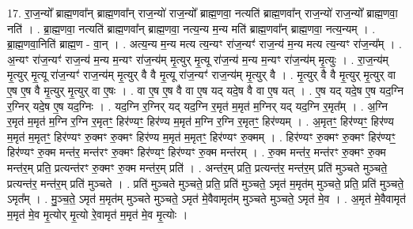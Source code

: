 \documentclass[17pt]{extarticle}
\begin{document}
17. रा॒ज॒न्यो᳚ ब्राह्म॒णवा᳚न् ब्राह्म॒णवा᳚न् राज॒न्यो॑ राज॒न्यो᳚ ब्राह्म॒णवा॒ नत्यति॑ ब्राह्म॒णवा᳚न् राज॒न्यो॑ राज॒न्यो᳚ ब्राह्म॒णवा॒ नति॑ । . ब्रा॒ह्म॒णवा॒ नत्यति॑ ब्राह्म॒णवा᳚न् ब्राह्म॒णवा॒ नत्य॒न्य म॒न्य मति॑ ब्राह्म॒णवा᳚न् ब्राह्म॒णवा॒ नत्य॒न्यम् । . ब्रा॒ह्म॒णवा॒निति॑ ब्राह्म॒ण - वा॒न् । . अत्य॒न्य म॒न्य मत्य त्य॒न्यꣳ रा॑ज॒न्यꣳ॑ राज॒न्य॑ म॒न्य मत्य त्य॒न्यꣳ रा॑ज॒न्य᳚म् । . अ॒न्यꣳ रा॑ज॒न्यꣳ॑ राज॒न्य॑ म॒न्य म॒न्यꣳ रा॑ज॒न्य॑म् मृ॒त्युर् मृ॒त्यू रा॑ज॒न्य॑ म॒न्य म॒न्यꣳ रा॑ज॒न्य॑म् मृ॒त्युः । . रा॒ज॒न्य॑म् मृ॒त्युर् मृ॒त्यू रा॑ज॒न्यꣳ॑ राज॒न्य॑म् मृ॒त्युर् वै वै मृ॒त्यू रा॑ज॒न्यꣳ॑ राज॒न्य॑म् मृ॒त्युर् वै । . मृ॒त्युर् वै वै मृ॒त्युर् मृ॒त्युर् वा ए॒ष ए॒ष वै मृ॒त्युर् मृ॒त्युर् वा ए॒षः । . वा ए॒ष ए॒ष वै वा ए॒ष यद् यदे॒ष वै वा ए॒ष यत् । . ए॒ष यद् यदे॒ष ए॒ष यद॒ग्नि र॒ग्निर् यदे॒ष ए॒ष यद॒ग्निः । . यद॒ग्नि र॒ग्निर् यद् यद॒ग्नि र॒मृत॑ म॒मृत॑ म॒ग्निर् यद् यद॒ग्नि र॒मृत᳚म् । . अ॒ग्नि र॒मृत॑ म॒मृत॑ म॒ग्नि र॒ग्नि र॒मृतꣳ॒॒ हिर॑ण्यꣳ॒॒ हिर॑ण्य म॒मृत॑ म॒ग्नि र॒ग्नि र॒मृतꣳ॒॒ हिर॑ण्यम् । . अ॒मृतꣳ॒॒ हिर॑ण्यꣳ॒॒ हिर॑ण्य म॒मृत॑ म॒मृतꣳ॒॒ हिर॑ण्यꣳ रु॒क्मꣳ रु॒क्मꣳ हिर॑ण्य म॒मृत॑ म॒मृतꣳ॒॒ हिर॑ण्यꣳ रु॒क्मम् । . हिर॑ण्यꣳ रु॒क्मꣳ रु॒क्मꣳ हिर॑ण्यꣳ॒॒ हिर॑ण्यꣳ रु॒क्म मन्त॑र॒ मन्त॑रꣳ रु॒क्मꣳ हिर॑ण्यꣳ॒॒ हिर॑ण्यꣳ रु॒क्म मन्त॑रम् । . रु॒क्म मन्त॑र॒ मन्त॑रꣳ रु॒क्मꣳ रु॒क्म मन्त॑र॒म् प्रति॒ प्रत्यन्त॑रꣳ रु॒क्मꣳ रु॒क्म मन्त॑र॒म् प्रति॑ । . अन्त॑र॒म् प्रति॒ प्रत्यन्त॑र॒ मन्त॑र॒म् प्रति॑ मुञ्चते मुञ्चते॒ प्रत्यन्त॑र॒ मन्त॑र॒म् प्रति॑ मुञ्चते । . प्रति॑ मुञ्चते मुञ्चते॒ प्रति॒ प्रति॑ मुञ्चते॒ ऽमृत॑ म॒मृत॑म् मुञ्चते॒ प्रति॒ प्रति॑ मुञ्चते॒ ऽमृत᳚म् । . मु॒ञ्च॒ते॒ ऽमृत॑ म॒मृत॑म् मुञ्चते मुञ्चते॒ ऽमृत॑ मे॒वैवामृत॑म् मुञ्चते मुञ्चते॒ ऽमृत॑ मे॒व । . अ॒मृत॑ मे॒वैवामृत॑ म॒मृत॑ मे॒व मृ॒त्योर् मृ॒त्यो रे॒वामृत॑ म॒मृत॑ मे॒व मृ॒त्योः । \newline
\end{document}
